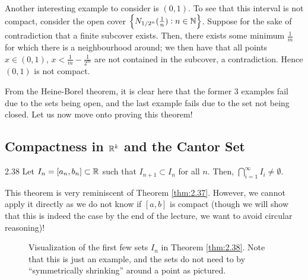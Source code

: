 Another interesting example to consider is $(0, 1)$. To see that this interval is not compact, consider the open cover $\set{N_{1/2^n}(\frac{1}{n}): n \in \mathbb{N}}$. Suppose for the sake of contradiction that a finite subcover exists. Then, there exists some minimum $\frac{1}{m}$ for which there is a neighbourhood around; we then have that all points $x \in (0,1)$, $x < \frac{1}{m} - \frac{1}{2^m}$ are not contained in the subcover, a contradiction. Hence $(0, 1)$ is not compact.

From the Heine-Borel theorem, it is clear here that the former 3 examples fail due to the sets being open, and the last example fails due to the set not being closed. Let us now move onto proving this theorem!

\subsection{Compactness in \texorpdfstring{$\mathbb{R}^k$}{TEXT} and the Cantor Set}

\begin{theorem}{}{2.38}
    Let $I_n = [a_n, b_n] \subset \mathbb{R}$ such that $I_{n+1} \subset I_n$ for all $n$. Then, $\bigcap_{i=1}^\infty I_i \neq \emptyset$. 
\end{theorem}
\noindent This theorem is very reminiscent of Theorem \ref{thm:2.37}. However, we cannot apply it directly as we do not know if $[a, b]$ is compact (though we will show that this is indeed the case by the end of the lecture, we want to avoid circular reasoning)!
\begin{figure}[htbp]
    \centering
    \caption{Visualization of the first few sets $I_n$ in Theorem \ref{thm:2.38}. Note that this is just an example, and the sets do not need to by ``symmetrically shrinking'' around a point as pictured.}
    \label{fig12}
\end{figure}

